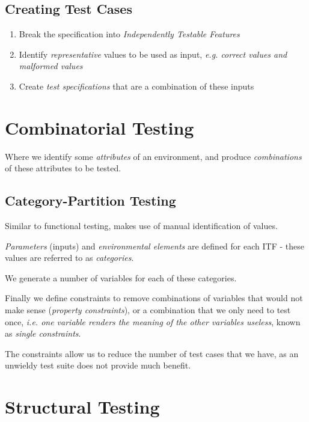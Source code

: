 \documentclass{article}
\begin{document}
\subsection{Creating Test Cases}

\begin{enumerate}
\item
  Break the specification into \textit{Independently Testable Features}
\item 
  Identify \textit{representative} values to be used as input, \textit{e.g. correct values and malformed values}
\item
  Create \textit{test specifications} that are a combination of these inputs
\end{enumerate}

\section{Combinatorial Testing}

Where we identify some \textit{attributes} of an environment, and produce \textit{combinations} of these attributes to be tested.

\subsection{Category-Partition Testing}

Similar to functional testing, makes use of manual identification of values.

\textit{Parameters} (inputs) and \textit{environmental elements} are defined for each ITF - these values are referred to as \textit{categories}.

We generate a number of variables for each of these categories.

Finally we define constraints to remove combinations of variables that would not make sense (\textit{property constraints}), or a combination that we only need to test once, \textit{i.e. one variable renders the meaning of the other variables useless}, known as \textit{single constraints}.

The constraints allow us to reduce the number of test cases that we have, as an unwieldy test suite does not provide much benefit.



\section{Structural Testing}
\end{document}
